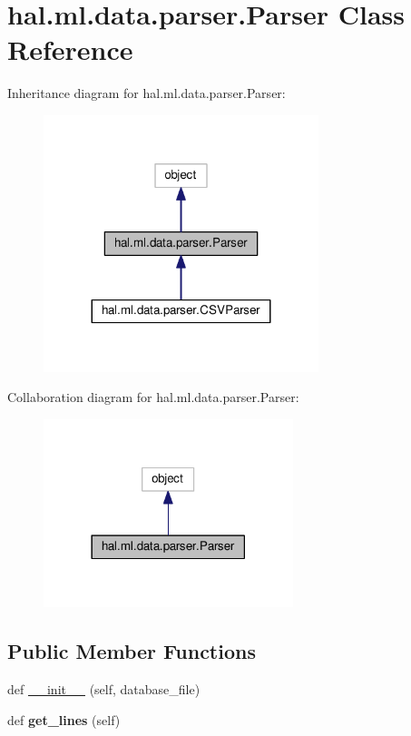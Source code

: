 \hypertarget{classhal_1_1ml_1_1data_1_1parser_1_1_parser}{}\section{hal.\+ml.\+data.\+parser.\+Parser Class Reference}
\label{classhal_1_1ml_1_1data_1_1parser_1_1_parser}


Inheritance diagram for hal.\+ml.\+data.\+parser.\+Parser\+:\nopagebreak
\begin{figure}[H]
\begin{center}
\leavevmode
\includegraphics[width=227pt]{classhal_1_1ml_1_1data_1_1parser_1_1_parser__inherit__graph}
\end{center}
\end{figure}


Collaboration diagram for hal.\+ml.\+data.\+parser.\+Parser\+:\nopagebreak
\begin{figure}[H]
\begin{center}
\leavevmode
\includegraphics[width=206pt]{classhal_1_1ml_1_1data_1_1parser_1_1_parser__coll__graph}
\end{center}
\end{figure}
\subsection*{Public Member Functions}
\begin{DoxyCompactItemize}
\item 
def \hyperlink{classhal_1_1ml_1_1data_1_1parser_1_1_parser_adc7a4812823d9c636eb8977c6d450e6a}{\+\_\+\+\_\+init\+\_\+\+\_\+} (self, database\+\_\+file)
\item 
def {\bfseries get\+\_\+lines} (self)\hypertarget{classhal_1_1ml_1_1data_1_1parser_1_1_parser_aaf10b0c434100a1c3effd5e5ee0ee2a3}{}\label{classhal_1_1ml_1_1data_1_1parser_1_1_parser_aaf10b0c434100a1c3effd5e5ee0ee2a3}

\end{DoxyCompactItemize}
